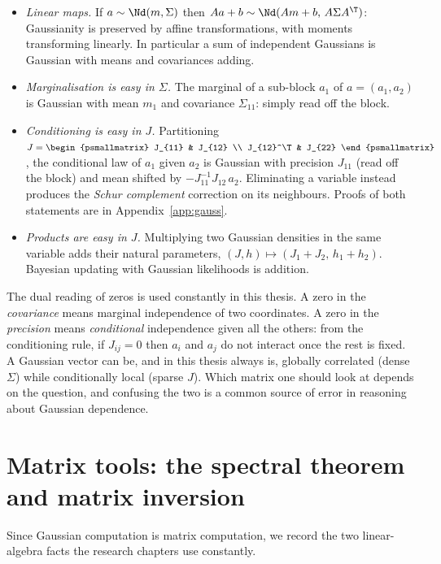 \begin{itemize}
  \item \emph{Linear maps.} If $a \sim \Nd(m, \Sigma)$ then
  $Aa + b \sim \Nd(Am + b,\, A \Sigma A^\T)$: Gaussianity is preserved by
  affine transformations, with moments transforming linearly. In
  particular a sum of independent Gaussians is Gaussian with means and
  covariances adding.
  \item \emph{Marginalisation is easy in $\Sigma$.} The marginal of a
  sub-block $a_1$ of $a = (a_1, a_2)$ is Gaussian with mean $m_1$ and
  covariance $\Sigma_{11}$: simply read off the block.
  \item \emph{Conditioning is easy in $J$.} Partitioning
  $J = \begin{psmallmatrix} J_{11} & J_{12} \\ J_{12}^\T & J_{22}
  \end{psmallmatrix}$, the conditional law of $a_1$ given $a_2$ is
  Gaussian with precision $J_{11}$ (read off the block) and mean shifted
  by $-J_{11}^{-1} J_{12}\, a_2$. Eliminating a variable instead produces
  the \emph{Schur complement} correction on its neighbours. Proofs of
  both statements are in Appendix~\ref{app:gauss}.
  \item \emph{Products are easy in $J$.} Multiplying two Gaussian
  densities in the same variable adds their natural parameters,
  $(J, h) \mapsto (J_1 + J_2,\, h_1 + h_2)$. Bayesian updating with
  Gaussian likelihoods is addition.
\end{itemize}

The dual reading of zeros is used constantly in this thesis. A
zero in the \emph{covariance} means marginal independence of two
coordinates. A zero in the \emph{precision} means \emph{conditional}
independence given all the others: from the conditioning rule, if
$J_{ij} = 0$ then $a_i$ and $a_j$ do not interact once the rest is fixed.
A Gaussian vector can be, and in this thesis always is, globally
correlated (dense $\Sigma$) while conditionally local (sparse $J$). Which
matrix one should look at depends on the question, and confusing the
two is a common source of error in reasoning about Gaussian dependence.

\section{Matrix tools: the spectral theorem and matrix inversion}
\label{sec:matrix-tools}

Since Gaussian computation is matrix computation, we record the two
linear-algebra facts the research chapters use constantly.

